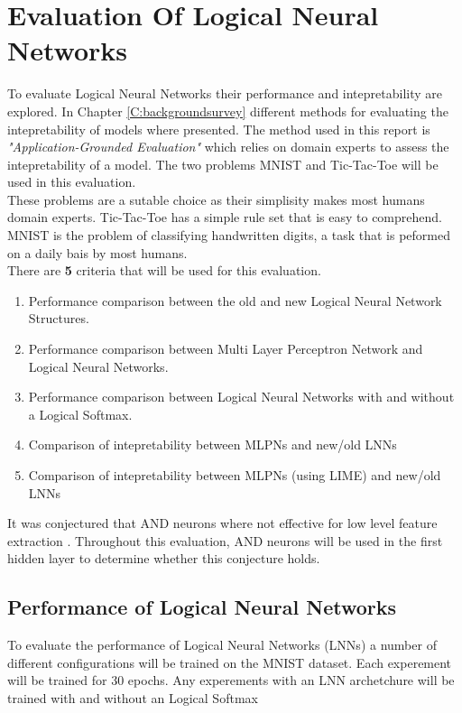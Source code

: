 \chapter{Evaluation Of Logical Neural Networks} \label{C:evaluation-lnn}
To evaluate Logical Neural Networks their performance and intepretability are explored. In Chapter \ref{C:backgroundsurvey} different methods for evaluating the intepretability of models where presented. The method used in this report is \textit{"Application-Grounded Evaluation"} \cite{doshi2017towards} which relies on domain experts to assess the intepretability of a model. The two problems MNIST \cite{mnistlecun} and Tic-Tac-Toe \cite{Lichman:2013} will be used in this evaluation.\\

These problems are a sutable choice as their simplisity makes most humans domain experts. Tic-Tac-Toe has a simple rule set that is easy to comprehend. MNIST is the problem of classifying handwritten digits, a task that is peformed on a daily bais by most humans.\\

There are \textbf{5} criteria that will be used for this evaluation.

\begin{enumerate}
	\item Performance comparison between the old and new Logical Neural Network Structures.
	\item Performance comparison between Multi Layer Perceptron Network and Logical Neural Networks.
	\item Performance comparison between Logical Neural Networks with and without a Logical Softmax.
	\item Comparison of intepretability between MLPNs and new/old LNNs
	\item Comparison of intepretability between MLPNs (using LIME) and new/old LNNs
\end{enumerate}

It was conjectured that AND neurons where not effective for low level feature extraction \cite{LearningLogicalActivations}. Throughout this evaluation, AND neurons will be used in the first hidden layer to determine whether this conjecture holds.


\section{Performance of Logical Neural Networks} \label{sec:lnn-eval-peformance}
To evaluate the performance of Logical Neural Networks (LNNs) a number of different configurations will be trained on the MNIST dataset. Each experement will be trained for 30 epochs. Any experements with an LNN archetchure will be trained with and without an Logical Softmax

